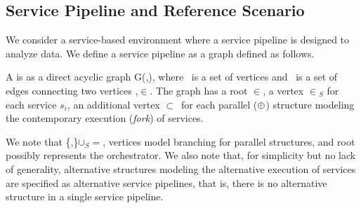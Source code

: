 \subsection{Service Pipeline and Reference Scenario}\label{sec:service_definition}
We consider a service-based environment where a service pipeline is designed to analyze data.
We define a service pipeline as a graph defined as follows. %
\begin{definition}[\pipeline]\label{def:pipeline}
  A \pipeline is as a direct acyclic graph G(\V,\E), where \V\ is a set of vertices and \E\ is a set of edges connecting two vertices ,$\in$\V.
  The graph has a root $\in$\V, a vertex $\in$\V$_S$ for each service $s_i$, an additional vertex $\subset$\V\ for each parallel ($\oplus$) structure modeling the contemporary execution (\emph{fork}) of services.
\end{definition}

We note that \{,\}$\cup$\V$_S$$=$\V, vertices  model branching for parallel structures, and root  possibly represents the orchestrator. We also note that, for simplicity but no lack of generality, alternative structures modeling the alternative execution of services are specified as alternative service pipelines, that is, there is no alternative structure in a single service pipeline.

